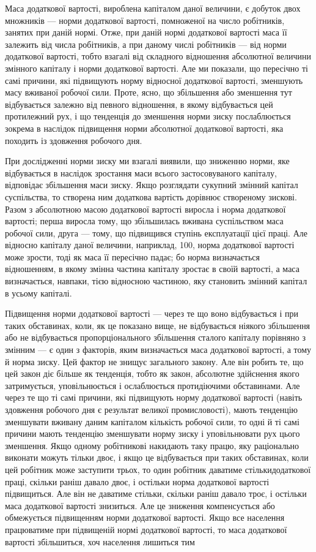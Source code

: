 Маса додаткової вартості, вироблена капіталом даної величини, є добуток двох множників — норми
додаткової вартості, помноженої на число робітників, занятих при даній нормі. Отже, при даній нормі
додаткової вартості маса її залежить від числа
робітників, а при даному числі робітників — від норми додаткової вартості, тобто взагалі від
складного відношення абсолютної
величини змінного капіталу і норми додаткової вартості. Але ми показали, що пересічно ті самі
причини, які підвищують норму відносної додаткової вартості, зменшують масу вживаної робочої сили.
Проте, ясно, що збільшення або зменшення тут відбувається залежно від певного відношення, в якому
відбувається цей протилежний рух, і що тенденція до зменшення норми зиску послаблюється зокрема в
наслідок підвищення норми абсолютної додаткової вартості, яка походить із здовження робочого дня.

При дослідженні норми зиску ми взагалі виявили, що зниженню норми, яке відбувається в наслідок
зростання маси всього застосовуваного капіталу, відповідає збільшення маси зиску. Якщо розглядати
сукупний змінний капітал суспільства, то
створена ним додаткова вартість дорівнює створеному зискові. Разом з абсолютною масою додаткової
вартості виросла і норма додаткової вартості; перша виросла тому, що збільшилась вживана
суспільством маса робочої сили, друга — тому, що підвищився ступінь експлуатації цієї праці. Але
відносно капіталу даної величини, наприклад, 100, норма додаткової вартості може зрости, тоді як
маса її пересічно падає; бо норма визначається відношенням, в якому змінна частина капіталу зростає
в своїй вартості, а маса визначається, навпаки, тією відносною частиною, яку становить змінний
капітал в усьому капіталі.

Підвищення норми додаткової вартості — через те що воно відбувається і при таких обставинах, коли,
як це показано вище, не відбувається ніякого збільшення або не відбувається пропорціонального
збільшення сталого капіталу порівняно з змінним — є один з факторів, яким визначається маса
додаткової вартості, а тому й норма зиску. Цей фактор не знищує загального закону. Але він робить
те, що цей закон діє більше як тенденція, тобто як закон, абсолютне здійснення якого затримується,
уповільнюється і ослаблюється протидіючими обставинами. Але через те що ті самі причини, які
підвищують норму додаткової вартості (навіть здовження робочого дня є результат великої
промисловості), мають тенденцію зменшувати вживану даним капіталом кількість робочої сили, то одні й
ті самі причини мають тенденцію зменшувати норму зиску і уповільнювати рух цього зменшення. Якщо
одному робітникові накидають таку працю, яку раціонально виконати можуть тільки двоє, і якщо це
відбувається при таких обставинах, коли цей робітник може заступити трьох, то один робітник даватиме
стількидодаткової праці, скільки раніш давало двоє, і остільки норма додаткової вартості
підвищиться. Але він не даватиме стільки, скільки раніш давало троє, і остільки маса додаткової
вартості знизиться. Але це зниження компенсується або обмежується підвищенням норми додаткової
вартості. Якщо все населення працюватиме при підвищеній нормі додаткової вартості, то маса
додаткової вартості збільшиться, хоч населення лишиться тим
\parbreak{}  %
